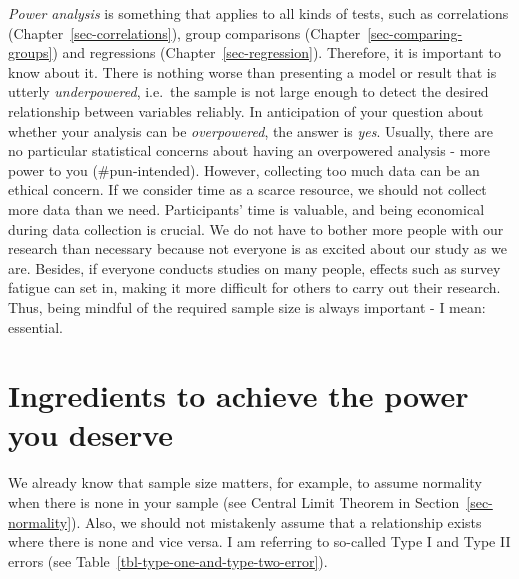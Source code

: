 \documentclass[
  letterpaper,
]{krantz}
\begin{document}
\emph{Power analysis} is something that applies to all kinds of tests,
such as correlations (Chapter~\ref{sec-correlations}), group comparisons
(Chapter~\ref{sec-comparing-groups}) and regressions
(Chapter~\ref{sec-regression}). Therefore, it is important to know about
it. There is nothing worse than presenting a model or result that is
utterly \emph{underpowered}, i.e.~the sample is not large enough to
detect the desired relationship between variables reliably. In
anticipation of your question about whether your analysis can be
\emph{overpowered}, the answer is \emph{yes}. Usually, there are no
particular statistical concerns about having an overpowered analysis -
more power to you (\#pun-intended). However, collecting too much data
can be an ethical concern. If we consider time as a scarce resource, we
should not collect more data than we need. Participants' time is
valuable, and being economical during data collection is crucial. We do
not have to bother more people with our research than necessary because
not everyone is as excited about our study as we are. Besides, if
everyone conducts studies on many people, effects such as survey fatigue
can set in, making it more difficult for others to carry out their
research. Thus, being mindful of the required sample size is always
important - I mean: essential.

\section{Ingredients to achieve the power you
deserve}\label{sec-sec-ingredients-power-analysis}

We already know that sample size matters, for example, to assume
normality when there is none in your sample (see Central Limit Theorem
in Section~\ref{sec-normality}). Also, we should not mistakenly assume
that a relationship exists where there is none and vice versa. I am
referring to so-called Type I and Type II errors (see
Table~\ref{tbl-type-one-and-type-two-error}).
\end{document}
